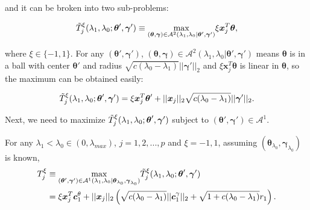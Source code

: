 and it can be broken into two sub-problems:

\begin{equation}
    \label{eq:ttilde}
    \Tilde{T}^\xi_j(\lambda_1,\lambda_0;\boldsymbol\theta',\boldsymbol\gamma')\equiv\underset{(\boldsymbol\theta,\boldsymbol\gamma)\in\mathcal{A}^2(\lambda_1,\lambda_0|\boldsymbol\theta',\boldsymbol\gamma')}{\mathrm{max}}\xi \boldsymbol x_j^T\boldsymbol\theta,
\end{equation}

where $\xi\in\{-1,1\}$. For any $(\boldsymbol\theta',\boldsymbol\gamma')$, $(\boldsymbol\theta,\boldsymbol\gamma)\in\mathcal{A}^2(\lambda_1,\lambda_0|\boldsymbol\theta',\boldsymbol\gamma')$ means $\boldsymbol\theta$ is in a ball with center $\boldsymbol\theta'$ and radius $\sqrt{c(\lambda_0-\lambda_1)}||\boldsymbol\gamma'||_2$ and $\xi \boldsymbol x_j^T\boldsymbol\theta$ is linear in $\boldsymbol\theta$, so the maximum can be obtained easily:

\begin{equation}
    \label{eq:ttildexi}
    \Tilde{T}^\xi_j(\lambda_1,\lambda_0;\boldsymbol\theta',\boldsymbol\gamma')=\xi \boldsymbol x_j^T\boldsymbol\theta'+||\boldsymbol x_j||_2\sqrt{c(\lambda_0-\lambda_1)}||\boldsymbol\gamma'||_2.
\end{equation}

Next, we need to maximize $\Tilde{T}^\xi_j(\lambda_1,\lambda_0;\boldsymbol\theta',\boldsymbol\gamma')$ subject to $(\boldsymbol\theta',\boldsymbol\gamma')\in\mathcal{A}^1$.

\begin{theorem}
    \label{thm:2.1}
    For any $\lambda_1<\lambda_{0}\in (0,\lambda_{max})$, $j=1,2,...,p$ and $\xi=-1,1$, assuming $(\boldsymbol\theta_{\lambda_0},\boldsymbol\gamma_{\lambda_0})$ is known,
    \begin{gather}
        \begin{aligned}
            T^\xi_j&\equiv\underset{(\boldsymbol\theta',\boldsymbol\gamma')\in\mathcal{A}^1(\lambda_1,\lambda_0|\boldsymbol\theta_{\lambda_0},\boldsymbol\gamma_{\lambda_0})}{\mathrm{max}}\Tilde{T}^\xi_j(\lambda_1,\lambda_0;\boldsymbol\theta',\boldsymbol\gamma')\\
            &=\xi \boldsymbol x_j^T \boldsymbol c_1^\theta+||\boldsymbol x_j||_2\left(\sqrt{c(\lambda_0-\lambda_1)}||\boldsymbol c_1^\gamma||_2+\sqrt{1+c(\lambda_0-\lambda_1)}r_1\right).
        \end{aligned}
    \end{gather}
\end{theorem}

